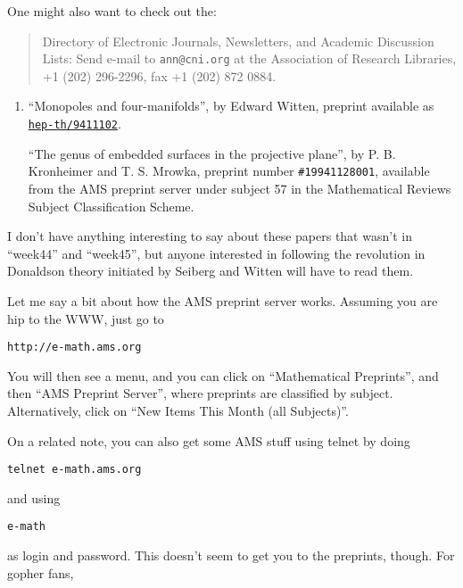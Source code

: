\documentclass{article}
\begin{document}
One might also want to check out the:

\begin{quote}
Directory of Electronic Journals, Newsletters, and Academic Discussion
Lists: Send e-mail to \texttt{ann@cni.org} at the Association of
Research Libraries, +1 (202) 296-2296, fax +1 (202) 872 0884.
\end{quote}

\begin{enumerate}
\def\labelenumi{\arabic{enumi})}
\setcounter{enumi}{1}
\item
  ``Monopoles and four-manifolds'', by Edward Witten, preprint available
  as
  \href{http://xxx.lanl.gov/abs/hep-th/9411102}{\texttt{hep-th/9411102}}.

  ``The genus of embedded surfaces in the projective plane'', by P. B.
  Kronheimer and T. S. Mrowka, preprint number \texttt{\#19941128001},
  available from the AMS preprint server under subject 57 in the
  Mathematical Reviews Subject Classification Scheme.
\end{enumerate}

I don't have anything interesting to say about these papers that wasn't
in ``week44'' and ``week45'', but anyone interested in following the
revolution in Donaldson theory initiated by Seiberg and Witten will have
to read them.

Let me say a bit about how the AMS preprint server works. Assuming you
are hip to the WWW, just go to

\begin{verbatim}
http://e-math.ams.org
\end{verbatim}

You will then see a menu, and you can click on ``Mathematical
Preprints'', and then ``AMS Preprint Server'', where preprints are
classified by subject. Alternatively, click on ``New Items This Month
(all Subjects)''.

On a related note, you can also get some AMS stuff using telnet by doing

\begin{verbatim}
telnet e-math.ams.org
\end{verbatim}

and using

\begin{verbatim}
e-math
\end{verbatim}

as login and password. This doesn't seem to get you to the preprints,
though. For gopher fans,
\end{document}
